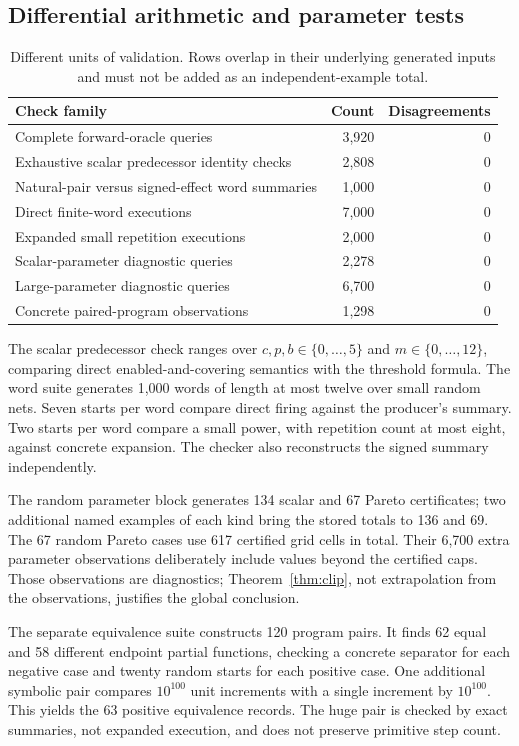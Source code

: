 \documentclass[11pt,a4paper]{article}
\theoremstyle{definition}
\theoremstyle{remark}
\begin{document}
\subsection{Differential arithmetic and parameter tests}
\begin{table}[htbp]
\centering
\begin{tabularx}{\linewidth}{@{}Xrr@{}}
\toprule
Check family & Count & Disagreements\\
\midrule
Complete forward-oracle queries & 3,920 & 0\\
Exhaustive scalar predecessor identity checks & 2,808 & 0\\
Natural-pair versus signed-effect word summaries & 1,000 & 0\\
Direct finite-word executions & 7,000 & 0\\
Expanded small repetition executions & 2,000 & 0\\
Scalar-parameter diagnostic queries & 2,278 & 0\\
Large-parameter diagnostic queries & 6,700 & 0\\
Concrete paired-program observations & 1,298 & 0\\
\bottomrule
\end{tabularx}
\caption{Different units of validation. Rows overlap in their underlying generated inputs and must not be added as an independent-example total.}\label{tab:differential}
\end{table}

The scalar predecessor check ranges over $c,p,b\in\{0,\ldots,5\}$ and $m\in\{0,\ldots,12\}$, comparing direct enabled-and-covering semantics with the threshold formula. The word suite generates 1,000 words of length at most twelve over small random nets. Seven starts per word compare direct firing against the producer's summary. Two starts per word compare a small power, with repetition count at most eight, against concrete expansion. The checker also reconstructs the signed summary independently.

The random parameter block generates 134 scalar and 67 Pareto certificates; two additional named examples of each kind bring the stored totals to 136 and 69. The 67 random Pareto cases use 617 certified grid cells in total. Their 6,700 extra parameter observations deliberately include values beyond the certified caps. Those observations are diagnostics; Theorem~\ref{thm:clip}, not extrapolation from the observations, justifies the global conclusion.

The separate equivalence suite constructs 120 program pairs. It finds 62 equal and 58 different endpoint partial functions, checking a concrete separator for each negative case and twenty random starts for each positive case. One additional symbolic pair compares $10^{100}$ unit increments with a single increment by $10^{100}$. This yields the 63 positive equivalence records. The huge pair is checked by exact summaries, not expanded execution, and does not preserve primitive step count.
\end{document}
